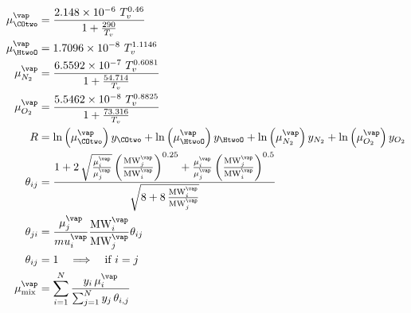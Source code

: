                 \begin{align}
                    \mu ^{\vap}_{\COtwo} &= \frac{2.148 \times 10^{-6} \ T_v^{0.46}}{1+\frac{290}{T_v}} \\
                    \mu ^{\vap}_{\HtwoO} &= 1.7096\times 10^{-8} \ T_v^{1.1146} \\
                    \mu ^{\vap}_{N_2} &= \frac{6.5592\times 10^{-7} \ T_v^{0.6081}}{1+\frac{54.714}{T_v}} \\
                    \mu ^{\vap}_{O_2} &= \frac{5.5462\times 10^{-8} \ T_v^{0.8825}}{1+\frac{73.316}{T_v}} \\
                    R &= \ln\left(\mu^{\vap}_{\COtwo}\right) y_{\COtwo}+\ln\left(\mu^{\vap}_{\HtwoO}\right) y_{\HtwoO}+\ln\left(\mu^{\vap}_{N_2}\right) y_{N_2}+\ln\left(\mu^{\vap}_{O_2}\right) y_{O_2} \\
                    \theta_{ij} &= \frac{1 + 2\,\sqrt{\frac{\mu^{\vap}_{i}}{\mu^{\vap}_{j}}}\left(\frac{\text{MW}^{\vap}_{j}}{\text{MW}^{\vap}_{i}}\right)^{0.25} + \frac{\mu^{\vap}_{i}}{\mu^{\vap}_{j}}\left(\frac{\text{MW}^{\vap}_{j}}{\text{MW}^{\vap}_{i}}\right)^{0.5}}{\sqrt{8 + 8\,\frac{\text{MW}^{\vap}_{i}}{\text{MW}^{\vap}_{j}}}} \\
                    \theta_{ji} &= \frac{\mu ^{\vap}_{j}}{mu ^{\vap}_{i}}\frac{\text{MW}^{\vap}_{i}}{\text{MW}^{\vap}_{j}}\theta_{ij}  \\
                    \theta_{ij} &= 1 \quad\Longrightarrow\quad \text{if } i = j \\
                    \mu^{\vap}_{\text{mix}} &= \sum_{i=1}^{N} \frac{y_i \,\mu^{\vap}_{i}}{\sum_{j=1}^{N} y_j \,\theta_{i,j}}
                \end{align}

